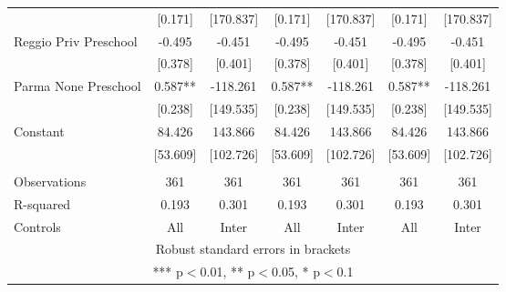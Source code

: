 \begin{tabular}{lcccccc}
 & [0.171] & [170.837] & [0.171] & [170.837] & [0.171] & [170.837] \\
Reggio Priv Preschool & -0.495 & -0.451 & -0.495 & -0.451 & -0.495 & -0.451 \\
 & [0.378] & [0.401] & [0.378] & [0.401] & [0.378] & [0.401] \\
Parma None Preschool & 0.587** & -118.261 & 0.587** & -118.261 & 0.587** & -118.261 \\
 & [0.238] & [149.535] & [0.238] & [149.535] & [0.238] & [149.535] \\
Constant & 84.426 & 143.866 & 84.426 & 143.866 & 84.426 & 143.866 \\
 & [53.609] & [102.726] & [53.609] & [102.726] & [53.609] & [102.726] \\
 &  &  &  &  &  &  \\
Observations & 361 & 361 & 361 & 361 & 361 & 361 \\
R-squared & 0.193 & 0.301 & 0.193 & 0.301 & 0.193 & 0.301 \\
 Controls & All & Inter & All & Inter & All & Inter \\ \hline
\multicolumn{7}{c}{ Robust standard errors in brackets} \\
\multicolumn{7}{c}{ *** p$<$0.01, ** p$<$0.05, * p$<$0.1} \\
\end{tabular}
